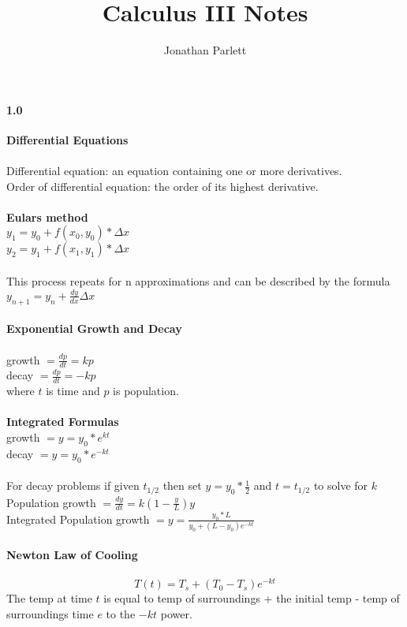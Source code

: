 \documentclass[14pt]{extreport}
\title{Calculus III Notes}
\author{Jonathan Parlett}
\begin{document}
\paragraph{1.0}\textbf{Differential Equations}\\\\

Differential equation: an equation containing one or more derivatives.\\
Order of differential equation: the order of its highest derivative.\\\\

\textbf{Eulars method}\\
$y_1 = y_0 + f(x_0, y_0)*\Delta x$\\
$y_2 = y_1 + f(x_1, y_1)*\Delta x$\\\\
This process repeats for n approximations and can be described by the formula\\
$y_{n+1} = y_n + \frac{dy}{dx}\Delta x$\\\\


\textbf{Exponential Growth and Decay}\\\\
growth $= \frac{dp}{dt} = kp$\\
decay  $= \frac{dp}{dt} = -kp$\\
where $t$ is time and $p$ is population.\\\\

\textbf{Integrated Formulas}\\
growth $= y = y_0 * e^{kt}$\\
decay  $= y = y_0 * e^{-kt}$\\\\
For decay problems if given $t_{1/2}$ then set $y=y_0*\frac{1}{2}$ and $t=t_{1/2}$ to solve for $k$\\

Population growth $= \frac{dy}{dt} = k(1 - \frac{y}{L})y$\\
Integrated Population growth $= y = \frac{y_0*L}{y_0 +(L-y_0)e^{-kt}}$\\\\

\textbf{Newton Law of Cooling}\\\\
$$T(t) = T_s + (T_0 -T_s)e^{-kt}$$
The temp at time $t$ is equal to temp of surroundings + the initial temp - temp of surroundings
time $e$ to the $-kt$ power.\\\\
\end{document}
